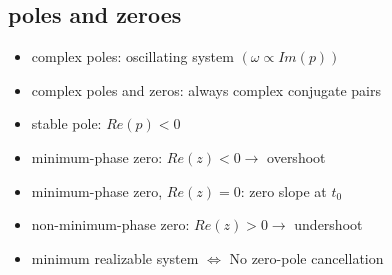 \subsection{poles and zeroes}
\begin{itemize}
    \item complex poles: oscillating system $(\omega \propto Im(p))$
    \item complex poles and zeros: always complex conjugate pairs
    \item stable pole: $Re(p) < 0$
    \item minimum-phase zero: $Re(z) < 0 \rightarrow$ overshoot
    \item minimum-phase zero, $Re(z) = 0$: zero slope at $t_0$
    \item non-minimum-phase zero: $Re(z) > 0 \rightarrow$ undershoot
    \item minimum realizable system $\Leftrightarrow$ No zero-pole cancellation
\end{itemize}